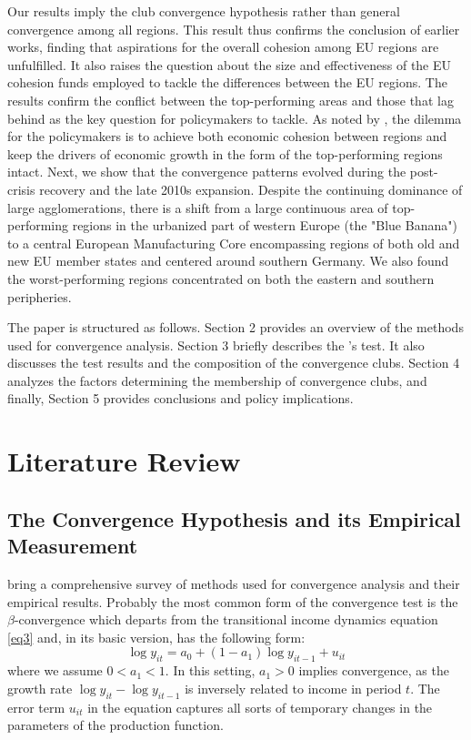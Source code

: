\documentclass[11pt]{article}
\begin{document}
Our results imply the club convergence hypothesis rather than general convergence among all regions. This result thus confirms the conclusion of earlier works, finding that aspirations for the overall cohesion among EU regions are unfulfilled. It also raises the question about the size and effectiveness of the EU cohesion funds employed to tackle the differences between the EU regions. The results confirm the conflict between the top-performing areas and those that lag behind as the key question for policymakers to tackle. As noted by \citep{iammarino2017regional}, the dilemma for the policymakers is to achieve both economic cohesion between regions and keep the drivers of economic growth in the form of the top-performing regions intact. Next, we show that the convergence patterns evolved during the post-crisis recovery and the late 2010s expansion. Despite the continuing dominance of large agglomerations, there is a shift from a large continuous area of top-performing regions in the urbanized part of western Europe (the "Blue Banana") to a central European Manufacturing Core encompassing regions of both old and new EU member states and centered around southern Germany. We also found the worst-performing regions concentrated on both the eastern and southern peripheries.


The paper is structured as follows. Section 2 provides an overview of the methods used for convergence analysis. Section 3 briefly describes the \citeauthor{phillips2007transition}'s test. It also discusses the test results and the composition of the convergence clubs. Section 4 analyzes the factors determining the membership of convergence clubs, and finally, Section 5 provides conclusions and policy implications.  


\section{Literature Review}\label{Methodology}
\subsection{The Convergence Hypothesis and its Empirical Measurement}

\citet{eckey2007convergence} bring a comprehensive survey of methods used for convergence analysis and their empirical results. Probably the most common form of the convergence test is the $\beta$-convergence which departs from the transitional income dynamics equation \eqref{eq3} and, in its basic version, has the following form:
\begin{equation} \label{eq1}\log y_{it} = a_{0} + (1 - a_{1})\log y_{it-1} + u_{it} \end{equation}
where we assume \(0 < a_{1} < 1\). In this setting, \(a_{1} > 0 \) implies convergence, as the growth rate \(\log y_{it} - \log y_{it-1}\) is inversely related to income in period $t$. The error term $u_{it}$ in the equation captures all sorts of temporary changes in the parameters of the production function.
\end{document}
